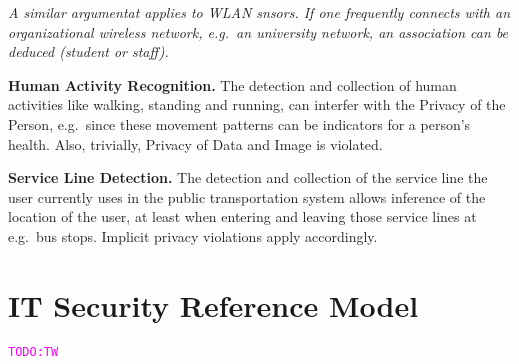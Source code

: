 \documentclass[runningheads,a4paper]{llncs}
\newcommand{\TODO}[1]{\begin{alltt}\textcolor{magenta}{TODO: #1}\end{alltt}}
\newenvironment{LGContent}
{ \par\color{blue} \it \small }
{ \par }
\begin{document}
\begin{LGContent}
A similar argumentat applies to WLAN snsors. If one frequently connects with an organizational wireless network, e.g.~an university network, an association can be deduced (student or staff).

\textbf{Human Activity Recognition.}
The detection and collection of human activities like walking, standing and running, can interfer with the Privacy of the Person, e.g.~since these movement patterns can be indicators for a person's health. Also, trivially, Privacy of Data and Image is violated.

\textbf{Service Line Detection.}
The detection and collection of the service line the user currently uses in the public transportation system allows inference of the location of the user, at least when entering and leaving those service lines at e.g.~bus stops.
Implicit privacy violations apply accordingly.

\end{LGContent}


\section{IT Security Reference Model}

\TODO{TW}
\end{document}
